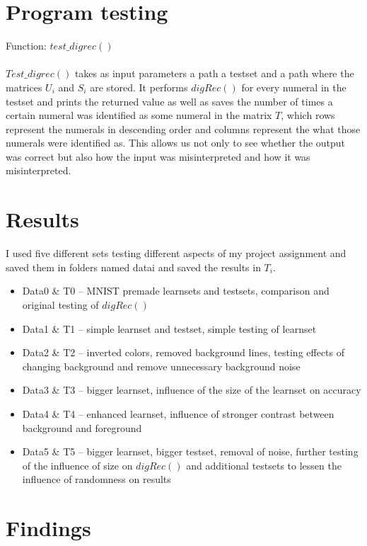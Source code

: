 \documentclass{article}
\begin{document}
	\section{Program testing}
	Function: $test\_digrec()$
	
	\paragraph{}
	$Test\_digrec()$ takes as input parameters a path a testset and a path where the matrices $U_i$ and $S_i$ are stored.
	It performs $digRec()$ for every numeral in the testset and prints the returned value as well as saves the number of times a certain numeral was identified as some numeral in the matrix $T$, which rows represent the numerals in descending order and columns represent the what those numerals were identified as.
	This allows us not only to see whether the output was correct but also how the input was misinterpreted and how it was misinterpreted.
	
	\section{Results}
	I used five different sets testing different aspects of my project assignment and saved them in folders named datai and saved the results in $T_i$.
	\begin{itemize}
	\item Data0 \& T0 – MNIST premade learnsets and testsets, comparison and original testing   of $digRec()$
	\item Data1 \& T1 – simple learnset and testset, simple testing of learnset
	\item Data2 \& T2 – inverted colors, removed background lines, testing effects of changing background and remove unnecessary background noise 
	\item Data3 \& T3 – bigger learnset, influence of the size of the learnset on accuracy
	\item Data4 \& T4 – enhanced learnset, influence of stronger contrast between background and foreground
	\item Data5 \& T5 – bigger learnset, bigger testset, removal of noise, further testing of the influence of size on $digRec()$ and additional testsets to lessen the influence of randomness on results
	\end{itemize}
	
	\section{Findings}
	
\end{document}
